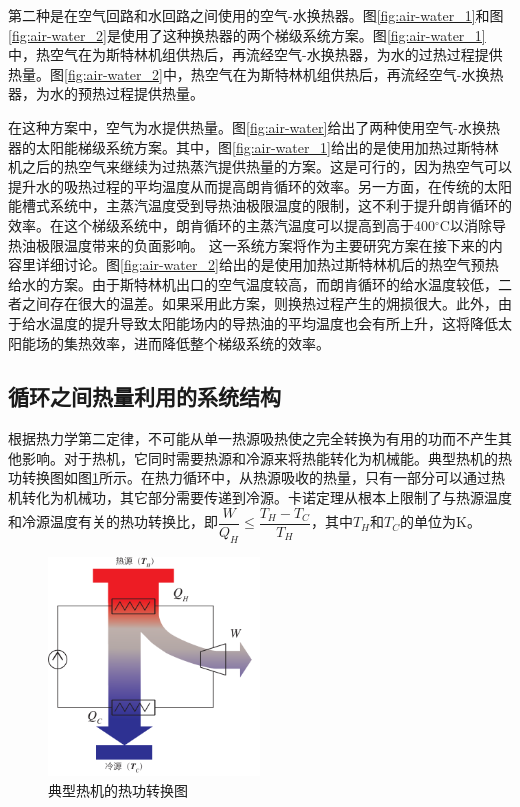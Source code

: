 第二种是在空气回路和水回路之间使用的空气-水换热器。图\ref{fig:air-water_1}和图\ref{fig:air-water_2}是使用了这种换热器的两个梯级系统方案。图\ref{fig:air-water_1}中，热空气在为斯特林机组供热后，再流经空气-水换热器，为水的过热过程提供热量。图\ref{fig:air-water_2}中，热空气在为斯特林机组供热后，再流经空气-水换热器，为水的预热过程提供热量。

在这种方案中，空气为水提供热量。图\ref{fig:air-water}给出了两种使用空气-水换热器的太阳能梯级系统方案。其中，图\ref{fig:air-water_1}给出的是使用加热过斯特林机之后的热空气来继续为过热蒸汽提供热量的方案。这是可行的，因为热空气可以提升水的吸热过程的平均温度从而提高朗肯循环的效率。另一方面，在传统的太阳能槽式系统中，主蒸汽温度受到导热油极限温度的限制，这不利于提升朗肯循环的效率。在这个梯级系统中，朗肯循环的主蒸汽温度可以提高到高于400$\mathrm{^\circ C}$以消除导热油极限温度带来的负面影响。
这一系统方案将作为主要研究方案在接下来的内容里详细讨论。图\ref{fig:air-water_2}给出的是使用加热过斯特林机后的热空气预热给水的方案。由于斯特林机出口的空气温度较高，而朗肯循环的给水温度较低，二者之间存在很大的温差。如果采用此方案，则换热过程产生的㶲损很大。此外，由于给水温度的提升导致太阳能场内的导热油的平均温度也会有所上升，这将降低太阳能场的集热效率，进而降低整个梯级系统的效率。

\subsection{循环之间热量利用的系统结构}
\label{sec:HRBC}

根据热力学第二定律，不可能从单一热源吸热使之完全转换为有用的功而不产生其他影响。对于热机，它同时需要热源和冷源来将热能转化为机械能。典型热机的热功转换图如图\ref{fig:engines}所示。在热力循环中，从热源吸收的热量，只有一部分可以通过热机转化为机械功，其它部分需要传递到冷源。卡诺定理从根本上限制了与热源温度和冷源温度有关的热功转换比，即$\dfrac{W}{Q_H} \leqslant \dfrac{T_H - T_C}{T_H}$，其中$T_H$和$T_C$的单位为$\mathrm{K}$。
\begin{figure}[htb]
\centering 
\includegraphics[width=0.5\textwidth]{fig/engines}
\caption{典型热机的热功转换图}
\label{fig:engines}
\end{figure}

